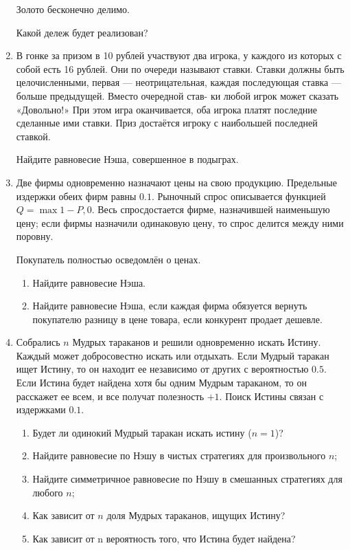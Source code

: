 \documentclass[12pt]{article} %
\theoremstyle{definition} %
\begin{document}
\begin{enumerate}
Золото бесконечно делимо.

Какой дележ будет реализован?


\item В гонке за призом в 10 рублей участвуют два игрока, у каждого из которых с собой есть 16
рублей. Они по очереди называют ставки. Ставки должны быть целочисленными, первая —
неотрицательная, каждая последующая ставка — больше предыдущей. Вместо очередной став-
ки любой игрок может сказать «Довольно!» При этом игра оканчивается, оба игрока платят
последние сделанные ими ставки. Приз достаётся игроку с наибольшей последней ставкой.

Найдите равновесие Нэша, совершенное в подыграх.

\newpage
\item Две фирмы одновременно назначают цены на свою продукцию. 
Предельные издержки обеих фирм равны $0.1$.
Рыночный спрос описывается функцией $Q = \max {1 - P, 0}$. 
Весь спросдостается фирме, назначившей наименьшую цену; 
если фирмы назначили одинаковую цену, то спрос делится между ними поровну.

Покупатель полностью осведомлён о ценах. 


\begin{enumerate}
  \item Найдите равновесие Нэша.
  \item Найдите равновесие Нэша, если каждая фирма обязуется вернуть покупателю разницу в цене товара, если конкурент продает дешевле.
\end{enumerate}

\item Собрались $n$ Мудрых тараканов и решили одновременно искать Истину. 
Каждый может добросовестно искать или отдыхать. 
Если Мудрый таракан ищет Истину, то он находит ее независимо от
других с вероятностью $0.5$. 
Если Истина будет найдена хотя бы одним Мудрым тараканом, то он
расскажет ее всем, и все получат полезность $+1$. 
Поиск Истины связан с издержками $0.1$.

\begin{enumerate}
  \item Будет ли одинокий Мудрый таракан искать истину ($n = 1$)?
  \item Найдите равновесие по Нэшу в чистых стратегиях для произвольного $n$;
  \item Найдите симметричное равновесие по Нэшу в смешанных стратегиях для любого $n$;
  \item Как зависит от $n$ доля Мудрых тараканов, ищущих Истину?
  \item Как зависит от n вероятность того, что Истина будет найдена?
\end{enumerate}


\end{enumerate}
\end{document}
